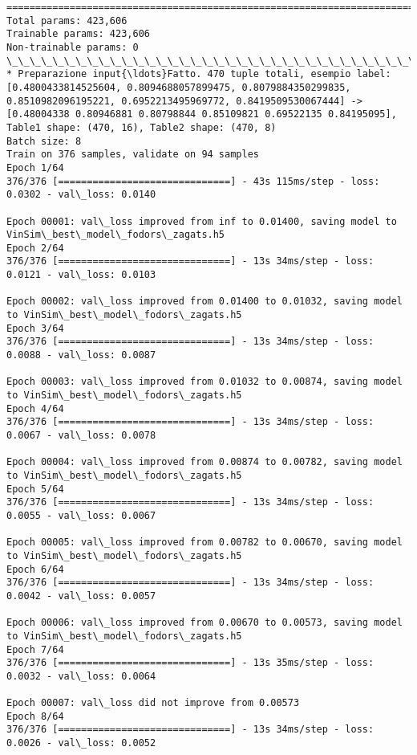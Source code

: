 \documentclass[11pt]{article}
\begin{document}
\begin{Verbatim}[commandchars=\\\{\}]
==================================================================================================
Total params: 423,606
Trainable params: 423,606
Non-trainable params: 0
\_\_\_\_\_\_\_\_\_\_\_\_\_\_\_\_\_\_\_\_\_\_\_\_\_\_\_\_\_\_\_\_\_\_\_\_\_\_\_\_\_\_\_\_\_\_\_\_\_\_\_\_\_\_\_\_\_\_\_\_\_\_\_\_\_\_\_\_\_\_\_\_\_\_\_\_\_\_\_\_\_\_\_\_\_\_\_\_\_\_\_\_\_\_\_\_\_\_
* Preparazione input{\ldots}Fatto. 470 tuple totali, esempio label: [0.4800433814525604, 0.8094688057899475, 0.8079884350299835, 0.8510982096195221, 0.6952213495969772, 0.8419509530067444] -> [0.48004338 0.80946881 0.80798844 0.85109821 0.69522135 0.84195095], Table1 shape: (470, 16), Table2 shape: (470, 8)
Batch size: 8
Train on 376 samples, validate on 94 samples
Epoch 1/64
376/376 [==============================] - 43s 115ms/step - loss: 0.0302 - val\_loss: 0.0140

Epoch 00001: val\_loss improved from inf to 0.01400, saving model to VinSim\_best\_model\_fodors\_zagats.h5
Epoch 2/64
376/376 [==============================] - 13s 34ms/step - loss: 0.0121 - val\_loss: 0.0103

Epoch 00002: val\_loss improved from 0.01400 to 0.01032, saving model to VinSim\_best\_model\_fodors\_zagats.h5
Epoch 3/64
376/376 [==============================] - 13s 34ms/step - loss: 0.0088 - val\_loss: 0.0087

Epoch 00003: val\_loss improved from 0.01032 to 0.00874, saving model to VinSim\_best\_model\_fodors\_zagats.h5
Epoch 4/64
376/376 [==============================] - 13s 34ms/step - loss: 0.0067 - val\_loss: 0.0078

Epoch 00004: val\_loss improved from 0.00874 to 0.00782, saving model to VinSim\_best\_model\_fodors\_zagats.h5
Epoch 5/64
376/376 [==============================] - 13s 34ms/step - loss: 0.0055 - val\_loss: 0.0067

Epoch 00005: val\_loss improved from 0.00782 to 0.00670, saving model to VinSim\_best\_model\_fodors\_zagats.h5
Epoch 6/64
376/376 [==============================] - 13s 34ms/step - loss: 0.0042 - val\_loss: 0.0057

Epoch 00006: val\_loss improved from 0.00670 to 0.00573, saving model to VinSim\_best\_model\_fodors\_zagats.h5
Epoch 7/64
376/376 [==============================] - 13s 35ms/step - loss: 0.0032 - val\_loss: 0.0064

Epoch 00007: val\_loss did not improve from 0.00573
Epoch 8/64
376/376 [==============================] - 13s 34ms/step - loss: 0.0026 - val\_loss: 0.0052


\end{Verbatim}
\end{document}
